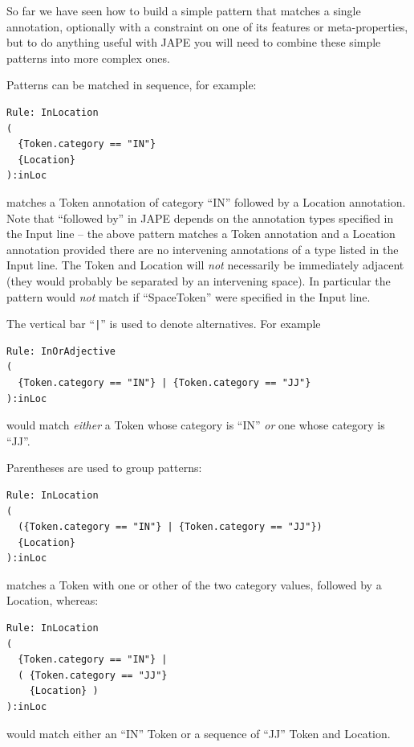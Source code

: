 So far we have seen how to build a simple pattern that matches a single
annotation, optionally with a constraint on one of its features or
meta-properties, but to do anything useful with JAPE you will need to combine
these simple patterns into more complex ones.


Patterns can be matched in sequence, for example:
\begin{small}
\begin{verbatim}
Rule: InLocation
(
  {Token.category == "IN"}
  {Location}
):inLoc
\end{verbatim}
\end{small}
matches a Token annotation of category ``IN'' followed by a Location
annotation.  Note that ``followed by'' in JAPE depends on the annotation types
specified in the Input line -- the above pattern matches a Token annotation and
a Location annotation provided there are no intervening annotations of a type
listed in the Input line.  The Token and Location will {\em not} necessarily be
immediately adjacent (they would probably be separated by an intervening space).
In particular the pattern would {\em not} match if ``SpaceToken'' were
specified in the Input line.

The vertical bar ``\verb!|!'' is used to denote alternatives.  For example
\begin{small}
\begin{verbatim}
Rule: InOrAdjective
(
  {Token.category == "IN"} | {Token.category == "JJ"}
):inLoc
\end{verbatim}
\end{small}
would match {\em either} a Token whose category is ``IN'' {\em or} one whose
category is ``JJ''.

Parentheses are used to group patterns:
\begin{small}
\begin{verbatim}
Rule: InLocation
(
  ({Token.category == "IN"} | {Token.category == "JJ"})
  {Location}
):inLoc
\end{verbatim}
\end{small}
matches a Token with one or other of the two category values, followed by a
Location, whereas:
\begin{small}
\begin{verbatim}
Rule: InLocation
(
  {Token.category == "IN"} |
  ( {Token.category == "JJ"}
    {Location} )
):inLoc
\end{verbatim}
\end{small}
would match either an ``IN'' Token or a sequence of ``JJ'' Token and Location.

